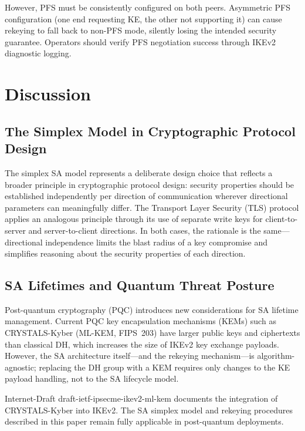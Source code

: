 \documentclass[sigconf,nonacm]{acmart}
\begin{document}
However, PFS must be consistently configured on both peers. Asymmetric PFS
configuration (one end requesting KE, the other not supporting it) can cause rekeying
to fall back to non-PFS mode, silently losing the intended security guarantee. Operators
should verify PFS negotiation success through IKEv2 diagnostic logging.

\section{Discussion}
\label{sec:discussion}

\subsection{The Simplex Model in Cryptographic Protocol Design}

The simplex SA model represents a deliberate design choice that reflects a broader
principle in cryptographic protocol design: security properties should be established
independently per direction of communication wherever directional parameters can
meaningfully differ. The Transport Layer Security (TLS) protocol applies an analogous
principle through its use of separate write keys for client-to-server and
server-to-client directions. In both cases, the rationale is the same---directional
independence limits the blast radius of a key compromise and simplifies reasoning
about the security properties of each direction.

\subsection{SA Lifetimes and Quantum Threat Posture}

Post-quantum cryptography (PQC) introduces new considerations for SA lifetime
management. Current PQC key encapsulation mechanisms (KEMs) such as CRYSTALS-Kyber
(ML-KEM, FIPS~203) have larger public keys and ciphertexts than classical DH, which
increases the size of IKEv2 key exchange payloads. However, the SA architecture
itself---and the rekeying mechanism---is algorithm-agnostic; replacing the DH
group with a KEM requires only changes to the KE payload handling, not to the SA
lifecycle model.

Internet-Draft draft-ietf-ipsecme-ikev2-ml-kem documents the integration of
CRYSTALS-Kyber into IKEv2. The SA simplex model and rekeying procedures described
in this paper remain fully applicable in post-quantum deployments.
\end{document}
